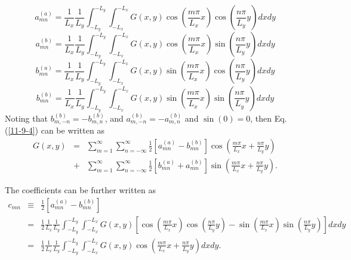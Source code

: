 \documentclass{article}
\begin{document}
\begin{equation}
  a_{m n}^{(a)} = \frac{1}{L_x}  \frac{1}{L_y} \int_{- L_y}^{- L_y} \int_{-
  L_x}^{- L_x} G (x, y) \cos \left( \frac{m \pi}{L_x} x \right) \cos \left(
  \frac{n \pi}{L_y} y \right) d x d y
\end{equation}
\begin{equation}
  a_{m n}^{(b)} = \frac{1}{L_x}  \frac{1}{L_y} \int_{- L_y}^{- L_y} \int_{-
  L_x}^{- L_x} G (x, y) \cos \left( \frac{m \pi}{L_x} x \right) \sin \left(
  \frac{n \pi}{L_y} y \right) d x d y
\end{equation}
\begin{equation}
  b_{m n}^{(a)} = \frac{1}{L_x} \frac{1}{L_y} \int_{- L_y}^{- L_y} \int_{-
  L_x}^{- L_x} G (x, y) \sin \left( \frac{m \pi}{L_x} x \right) \cos \left(
  \frac{n \pi}{L_y} y \right) d x d y
\end{equation}
\begin{equation}
  b_{m n}^{(b)} = \frac{1}{L_x} \frac{1}{L_y} \int_{- L_y}^{- L_y} \int_{-
  L_x}^{- L_x} G (x, y) \sin \left( \frac{m \pi}{L_x} x \right) \sin \left(
  \frac{n \pi}{L_y} y \right) d x d y
\end{equation}
Noting that $b_{m, - n}^{(b)} = - b_{m, n}^{(b)}$, and $a_{m, - n}^{(b)} = -
a_{m, n}^{(b)}$ and $\sin (0) = 0$, then Eq. (\ref{11-9-4}) can be written as
\begin{eqnarray}
  G (x, y) & = & \sum_{m = 1}^{\infty} \sum_{n = - \infty}^{\infty}
  \frac{1}{2} [a_{m n}^{(a)} - b_{m n}^{(b)}] \cos \left( \frac{m \pi}{L_x} x
  + \frac{n \pi}{L_y} y \right) \nonumber\\
  & + & \sum_{m = 1}^{\infty} \sum_{n = - \infty}^{\infty} \frac{1}{2} [b_{m
  n}^{(a)} + a_{m n}^{(b)}] \sin \left( \frac{m \pi}{L_x} x + \frac{n
  \pi}{L_y} y \right) . 
\end{eqnarray}


The coefficients can be further written as
\begin{eqnarray}
  c_{m n} & \equiv & \frac{1}{2} [a_{m n}^{(a)} - b_{m n}^{(b)}] \nonumber\\
  & = & \frac{1}{2} \frac{1}{L_x}  \frac{1}{L_y} \int_{- L_y}^{- L_y} \int_{-
  L_x}^{- L_x} G (x, y) \left[ \cos \left( \frac{m \pi}{L_x} x \right) \cos
  \left( \frac{n \pi}{L_y} y \right) - \sin \left( \frac{m \pi}{L_x} x \right)
  \sin \left( \frac{n \pi}{L_y} y \right) \right] d x d y \nonumber\\
  & = & \frac{1}{2} \frac{1}{L_x}  \frac{1}{L_y} \int_{- L_y}^{- L_y} \int_{-
  L_x}^{- L_x} G (x, y) \cos \left( \frac{m \pi}{L_x} x + \frac{n \pi}{L_y} y
  \right) d x d y. 
\end{eqnarray}
\end{document}
